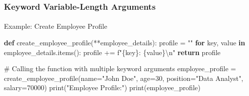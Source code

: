 \documentclass[
  letterpaper,
  DIV=11,
  numbers=noendperiod]{scrreprt}
\makeatletter
\let\oldparagraph\paragraph
\renewcommand{\paragraph}{
    \@ifstar
      \xxxParagraphStar
      \xxxParagraphNoStar
  }
\newcommand{\xxxParagraphStar}[1]{\oldparagraph*{#1}\mbox{}}
\newcommand{\xxxParagraphNoStar}[1]{\oldparagraph{#1}\mbox{}}
\newenvironment{Shaded}{\begin{snugshade}}{\end{snugshade}}
\newcommand{\BuiltInTok}[1]{\textcolor[rgb]{0.00,0.23,0.31}{#1}}
\newcommand{\CharTok}[1]{\textcolor[rgb]{0.13,0.47,0.30}{#1}}
\newcommand{\CommentTok}[1]{\textcolor[rgb]{0.37,0.37,0.37}{#1}}
\newcommand{\ControlFlowTok}[1]{\textcolor[rgb]{0.00,0.23,0.31}{\textbf{#1}}}
\newcommand{\DecValTok}[1]{\textcolor[rgb]{0.68,0.00,0.00}{#1}}
\newcommand{\KeywordTok}[1]{\textcolor[rgb]{0.00,0.23,0.31}{\textbf{#1}}}
\newcommand{\NormalTok}[1]{\textcolor[rgb]{0.00,0.23,0.31}{#1}}
\newcommand{\OperatorTok}[1]{\textcolor[rgb]{0.37,0.37,0.37}{#1}}
\newcommand{\SpecialCharTok}[1]{\textcolor[rgb]{0.37,0.37,0.37}{#1}}
\newcommand{\SpecialStringTok}[1]{\textcolor[rgb]{0.13,0.47,0.30}{#1}}
\newcommand{\StringTok}[1]{\textcolor[rgb]{0.13,0.47,0.30}{#1}}
\makeatother
\begin{document}
\begin{Shaded}
\end{Shaded}

\subsubsection{Keyword Variable-Length
Arguments}\label{keyword-variable-length-arguments}

\paragraph{Example: Create Employee
Profile}\label{example-create-employee-profile}

\begin{Shaded}
\begin{Highlighting}[]
\KeywordTok{def}\NormalTok{ create\_employee\_profile(}\OperatorTok{**}\NormalTok{employee\_details):}
\NormalTok{    profile }\OperatorTok{=} \StringTok{""}
    \ControlFlowTok{for}\NormalTok{ key, value }\KeywordTok{in}\NormalTok{ employee\_details.items():}
\NormalTok{        profile }\OperatorTok{+=} \SpecialStringTok{f"}\SpecialCharTok{\{}\NormalTok{key}\SpecialCharTok{\}}\SpecialStringTok{: }\SpecialCharTok{\{}\NormalTok{value}\SpecialCharTok{\}}\CharTok{\textbackslash{}n}\SpecialStringTok{"}
    \ControlFlowTok{return}\NormalTok{ profile}

\CommentTok{\# Calling the function with multiple keyword arguments}
\NormalTok{employee\_profile }\OperatorTok{=}\NormalTok{ create\_employee\_profile(name}\OperatorTok{=}\StringTok{"John Doe"}\NormalTok{, age}\OperatorTok{=}\DecValTok{30}\NormalTok{, position}\OperatorTok{=}\StringTok{"Data Analyst"}\NormalTok{, salary}\OperatorTok{=}\DecValTok{70000}\NormalTok{)}
\BuiltInTok{print}\NormalTok{(}\StringTok{"Employee Profile:"}\NormalTok{)}
\BuiltInTok{print}\NormalTok{(employee\_profile)}
\end{Highlighting}
\end{Shaded}
\end{document}
